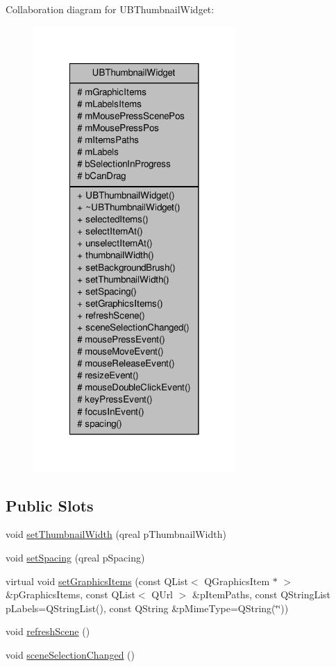 Collaboration diagram for U\-B\-Thumbnail\-Widget\-:
\nopagebreak
\begin{figure}[H]
\begin{center}
\leavevmode
\includegraphics[width=218pt]{d5/d71/class_u_b_thumbnail_widget__coll__graph}
\end{center}
\end{figure}
\subsection*{Public Slots}
\begin{DoxyCompactItemize}
\item 
void \hyperlink{class_u_b_thumbnail_widget_a3df63299295dda8099b9a08492c51167}{set\-Thumbnail\-Width} (qreal p\-Thumbnail\-Width)
\item 
void \hyperlink{class_u_b_thumbnail_widget_a190afbca25c5f63b5849ec28edb5113f}{set\-Spacing} (qreal p\-Spacing)
\item 
virtual void \hyperlink{class_u_b_thumbnail_widget_a79132d84b323d9d17fa7e9bc4c985404}{set\-Graphics\-Items} (const Q\-List$<$ Q\-Graphics\-Item $\ast$ $>$ \&p\-Graphics\-Items, const Q\-List$<$ Q\-Url $>$ \&p\-Item\-Paths, const Q\-String\-List p\-Labels=Q\-String\-List(), const Q\-String \&p\-Mime\-Type=Q\-String(\char`\"{}\char`\"{}))
\item 
void \hyperlink{class_u_b_thumbnail_widget_a18b797a72d96bffce0051b5c7d969c83}{refresh\-Scene} ()
\item 
void \hyperlink{class_u_b_thumbnail_widget_a7b6f8ce62946ce939fd7fa13f69a58a1}{scene\-Selection\-Changed} ()
\end{DoxyCompactItemize}
